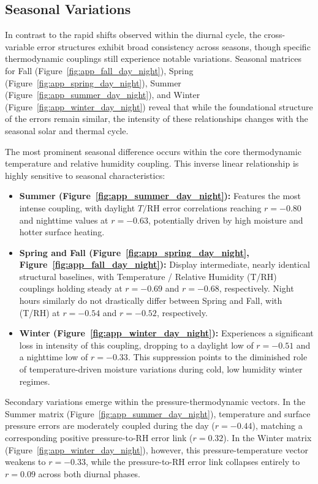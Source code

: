 \subsection{Seasonal Variations}

In contrast to the rapid shifts observed within the diurnal cycle, the cross-variable error structures exhibit broad consistency across seasons, though specific thermodynamic couplings still experience notable variations. Seasonal matrices for Fall (Figure~\ref{fig:app_fall_day_night}), Spring (Figure~\ref{fig:app_spring_day_night}), Summer (Figure~\ref{fig:app_summer_day_night}), and Winter (Figure~\ref{fig:app_winter_day_night}) reveal that while the foundational structure of the errors remain similar, the intensity of these relationships changes with the seasonal solar and thermal cycle.

The most prominent seasonal difference occurs within the core thermodynamic temperature and relative humidity coupling. This inverse linear relationship is highly sensitive to seasonal characteristics:
\begin{itemize}
    \item \textbf{Summer (Figure~\ref{fig:app_summer_day_night}):} Features the most intense coupling, with daylight $T/\text{RH}$ error correlations reaching $r = -0.80$ and nighttime values at $r = -0.63$, potentially driven by high moisture and hotter surface heating.
    \item \textbf{Spring and Fall (Figure~\ref{fig:app_spring_day_night}, Figure~\ref{fig:app_fall_day_night}):} Display intermediate, nearly identical structural baselines, with Temperature / Relative Humidity (T/RH) couplings holding steady at $r = -0.69$ and $r = -0.68$, respectively. Night hours similarly do not drastically differ between Spring and Fall, with (T/RH) at $r = -0.54$ and $r = -0.52$, respectively.
    \item \textbf{Winter (Figure~\ref{fig:app_winter_day_night}):} Experiences a significant loss in intensity of this coupling, dropping to a daylight low of $r = -0.51$ and a nighttime low of $r = -0.33$. This suppression points to the diminished role of temperature-driven moisture variations during cold, low humidity winter regimes.
\end{itemize}

Secondary variations emerge within the pressure-thermodynamic vectors. In the Summer matrix (Figure~\ref{fig:app_summer_day_night}), temperature and surface pressure errors are moderately coupled during the day ($r = -0.44$), matching a corresponding positive pressure-to-RH error link ($r = 0.32$). In the Winter matrix (Figure~\ref{fig:app_winter_day_night}), however, this pressure-temperature vector weakens to $r = -0.33$, while the pressure-to-RH error link collapses entirely to $r = 0.09$ across both diurnal phases.

